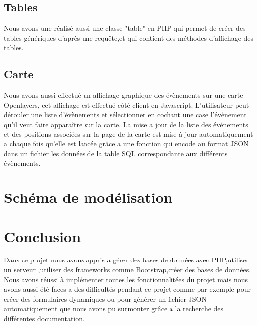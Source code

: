 \documentclass[french]{article}
\begin{document}
            \subsection{Tables}
            Nous avons une réalisé aussi une classe "table" en PHP qui permet de créer des tables génériques d'après une requête,et qui contient des méthodes d'affichage des tables.  
            \subsection{Carte}
            Nous avons aussi effectué un affichage graphique des évènements sur une carte Openlayers,
            cet affichage est effectué côté client en Javascript.
            L'utilisateur peut dérouler une liste d'évènements et sélectionner en cochant une case l'évènement qu'il veut faire apparaître sur la carte.
            La mise a jour de la liste des événements et des positions associées sur la page de la carte est mise à jour automatiquement a chaque fois qu'elle est lancée grâce a une fonction qui encode au format JSON dans un fichier les données de la table SQL correspondante aux différents évènements.
        \section{Schéma de modélisation}
        \section{Conclusion}
        Dans ce projet nous avons appris a gérer des bases de données avec PHP,utiliser un serveur ,utiliser des frameworks comme Bootstrap,créer des bases de données.
        Nous avons réussi à implémenter toutes les fonctionnalitées du projet mais nous avons aussi été faces a des difficultés pendant ce projet comme par exemple pour créer des formulaires dynamiques ou pour générer un fichier JSON automatiquement que nous avons pu surmonter grâce a la recherche des différentes documentation.
        
        
\end{document}
